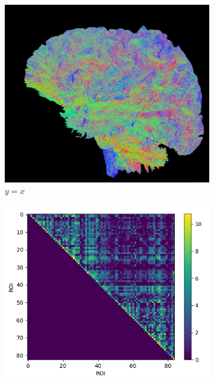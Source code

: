 \documentclass[msthesis.tex]{subfiles}
\def\Arrow{\raisebox{0.3\height}{\scalebox{2}{$\Rightarrow$}}}
\begin{document}
\begin{figure}
    \label{fig:pipeline}
     \centering
     \begin{subfigure}[b]{0.4\textwidth}
         \centering
         \includegraphics[height=\textwidth,width=\textwidth]{images/tractography.png}
         \caption{$y=x$}
         \label{fig:y equals x}
     \end{subfigure}
     \hfill
    \begin{subfigure}[m]{0.1\textwidth}
        \centering
        \vspace{-5cm}
         \Arrow{}
        \end{subfigure}
    \hfill
     \begin{subfigure}[b]{0.4\textwidth}
         \centering
         \includegraphics[height =\textwidth,width=\textwidth]{images/connectome_1M.png}

\end{subfigure}
\end{figure}
\end{document}
